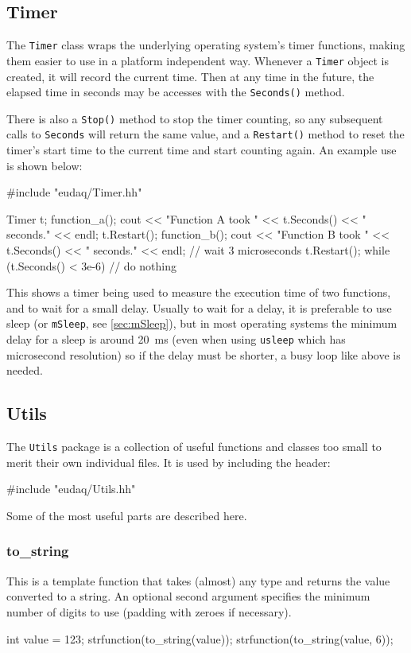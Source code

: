 \subsection{Timer}
The \texttt{Timer} class wraps the underlying operating system's timer functions,
making them easier to use in a platform independent way.
Whenever a \texttt{Timer} object is created, it will record the current time.
Then at any time in the future, the elapsed time in seconds may be accesses
with the \texttt{Seconds()} method.

There is also a \texttt{Stop()} method to stop the timer counting, so any subsequent calls
to \texttt{Seconds} will return the same value, and a \texttt{Restart()} method to
reset the timer's start time to the current time and start counting again.
An example use is shown below:
\begin{listing}[C++]
#include "eudaq/Timer.hh"

Timer t;
function_a();
cout << "Function A took " << t.Seconds() << " seconds." << endl;
t.Restart();
function_b();
cout << "Function B took " << t.Seconds() << " seconds." << endl;
// wait 3 microseconds
t.Restart();
while (t.Seconds() < 3e-6) {
  // do nothing
}
\end{listing}

This shows a timer being used to measure the execution time of two functions,
and to wait for a small delay.
Usually to wait for a delay, it is preferable to use sleep (or \texttt{mSleep}, see \autoref{sec:mSleep}),
but in most operating systems the minimum delay for a sleep is around 20~ms
(even when using \texttt{usleep} which has microsecond resolution)
so if the delay must be shorter, a busy loop like above is needed.

\subsection{Utils}
The \texttt{Utils} package is a collection of useful functions and classes too small to merit
their own individual files.
It is used by including the header:
\begin{listing}
#include "eudaq/Utils.hh"
\end{listing}

Some of the most useful parts are described here.

\subsubsection{to\_string}
This is a template function that takes (almost) any type and returns the value converted to a string.
An optional second argument specifies the minimum number of digits to use
(padding with zeroes if necessary).
\begin{listing}
int value = 123;
strfunction(to_string(value));
strfunction(to_string(value, 6));
\end{listing}

